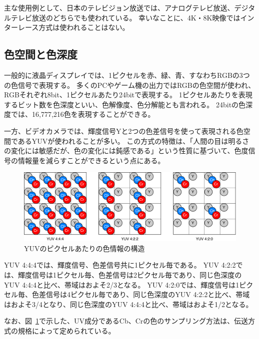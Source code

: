 主な使用例として、日本のテレビジョン放送では、アナログテレビ放送、デジタルテレビ放送のどちらでも使われている。
幸いなことに、4K・8K映像ではインターレース方式は使われることはない。%

\subsection{色空間と色深度}
\label{sec:colorspace}

一般的に液晶ディスプレイでは、1ピクセルを赤、緑、青、すなわちRGBの3つの色信号で表現する。
多くのPCやゲーム機の出力ではRGBの色空間が使われ、RGBそれぞれ8bit、1ピクセルあたり24bitで表現する。
1ピクセルあたりを表現するビット数を色深度といい、色解像度、色分解能とも言われる。
24bitの色深度では、16,777,216色を表現することができる。

一方、ビデオカメラでは、輝度信号Yと2つの色差信号を使って表現される色空間であるYUVが使われることが多い。%
この方式の特徴は、「人間の目は明るさの変化には敏感だが、色の変化には鈍感である」という性質に基づいて、色度信号の情報量を減らすことができるという点にある。

\begin{figure}[htbp]
  \begin{center}
    \includegraphics[bb=0 0 681 222,width=14cm]{img/yuv-pixel-structure.pdf}
  \end{center}
  \caption{YUVのピクセルあたりの色情報の構造}
  \label{fig:yuv-pixel-structure}
\end{figure}


YUV 4:4:4では、輝度信号、色差信号共に1ピクセル毎である。
YUV 4:2:2では、輝度信号は1ピクセル毎、色差信号は2ピクセル毎であり、同じ色深度のYUV 4:4:4と比べ、帯域はおよそ2/3となる。
YUV 4:2:0では、輝度信号は1ピクセル毎、色差信号は4ピクセル毎であり、同じ色深度のYUV 4:2:2と比べ、帯域はおよそ3/4となり、同じ色深度のYUV 4:4:4と比べ、帯域はおよそ1/2となる。

なお、図~\ref{fig:yuv-pixel-structure}で示した、UV成分であるCb、Crの色のサンプリング方法は、伝送方式の規格によって定められている。

